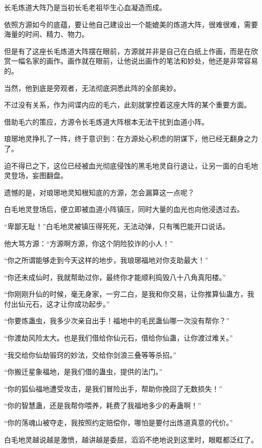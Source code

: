 \begin{this_body}
长毛炼道大阵乃是当初长毛老祖毕生心血凝造而成。

依照方源如今的底蕴，要让他自己建设出一个能媲美的炼道大阵，很难很难，需要海量的时间、精力、物力。

但是有了这座长毛炼道大阵摆在眼前，方源就并非是自己在白纸上作画，而是在欣赏一幅名家的画作。画作就在眼前，让他说出画作的笔法和妙处，他还是非常容易的。

当然，他到底是旁观者，无法彻底洞悉此阵的全部奥妙。

不过没有关系，作为间谍内应的毛六，此刻就掌控着这座大阵的某个重要方面。

借助毛六的策应，方源令长毛炼道大阵根本无法干扰到血道小阵。

琅琊地灵挣扎了一阵，终于意识到：在方源处心积虑的阴谋下，他已经无翻身之力了。

迫不得已之下，这位已经被血光彻底侵蚀的黑毛地灵自行退让，让另一面的白毛地灵登场，妄图翻盘。

遗憾的是，对琅琊地灵知根知底的方源，怎会漏算这一点呢？

白毛地灵登场后，便立即被血道小阵镇压，同时大量的血光也向他浸透过去。

“卑鄙无耻！”白毛地灵被镇压得死死，无法动弹，只有嘴巴能开口说话。

他大骂方源：“方源啊方源，你这个阴险狡诈的小人！”

“你之所谓能够走到今天这样的地步，我琅琊福地对你支助最大！”

“你还未成仙时，我就帮助过你，最终你才能顺利捣毁八十八角真阳楼。”

“你刚刚升仙的时候，毫无身家，一穷二白，是我和你交易，让你推算仙蛊方，我付出仙元石，这才让你成功起步。”

“你要炼蛊虫，我多少次亲自出手！福地中的毛民蛊仙哪一次没有帮你？”

“你渡劫风险太大。也是我们借给你仙元石，借给你仙蛊，让你渡过难关。”

“我交给你仙劫锻窍的妙法，交给你剑浪三叠等等杀招。”

“你搬迁星象福地，是我们借的蛊虫，提供的法门。”

“你的狐仙福地遭受攻击，是我们冒险出手，帮助你挽回了无数损失！”

“你的智慧蛊，还是我帮你喂养，耗费了我福地多少的寿蛊啊！”

“你的荡魂山被夺走，我按照约定赔偿你，哪怕是要付出炼道真意的代价。”

白毛地灵越说越是激愤，越讲越是委屈，滔滔不绝地说到这里时，眼眶都泛红了。


\end{this_body}
